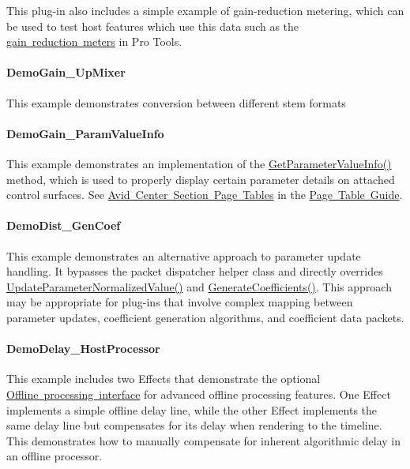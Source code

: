 This plug-\/in also includes a simple example of gain-\/reduction metering, which can be used to test host features which use this data such as the \mbox{\hyperlink{a00830_subsubsection__external_metering_and_internal_clip_}{gain reduction meters}} in Pro Tools.\hypertarget{a00848_DemoGain_UpMixer}{}\paragraph{Demo\+Gain\+\_\+\+Up\+Mixer}\label{a00848_DemoGain_UpMixer}
This example demonstrates conversion between different stem formats\hypertarget{a00848_DemoGain_ParamValueInfo}{}\paragraph{Demo\+Gain\+\_\+\+Param\+Value\+Info}\label{a00848_DemoGain_ParamValueInfo}
This example demonstrates an implementation of the \mbox{\hyperlink{a01669_a1702de6d62b5b41b6a8b2f510300392b}{Get\+Parameter\+Value\+Info()}} method, which is used to properly display certain parameter details on attached control surfaces. See \mbox{\hyperlink{a00833_aax_page_table_guide_04_avid_center_section_page_tables}{Avid Center Section Page Tables}} in the \mbox{\hyperlink{a00833}{Page Table Guide}}.\hypertarget{a00848_DemoDist_GenCoef}{}\paragraph{Demo\+Dist\+\_\+\+Gen\+Coef}\label{a00848_DemoDist_GenCoef}
This example demonstrates an alternative approach to parameter update handling. It bypasses the packet dispatcher helper class and directly overrides \mbox{\hyperlink{a01669_a685858711efb8634ce66c327f2865c71}{Update\+Parameter\+Normalized\+Value()}} and \mbox{\hyperlink{a01669_a083265b008921b6114ede387711694b7}{Generate\+Coefficients()}}. This approach may be appropriate for plug-\/ins that involve complex mapping between parameter updates, coefficient generation algorithms, and coefficient data packets.\hypertarget{a00848_DemoDelay_HostProcessor}{}\paragraph{Demo\+Delay\+\_\+\+Host\+Processor}\label{a00848_DemoDelay_HostProcessor}
This example includes two Effects that demonstrate the optional \mbox{\hyperlink{a00804}{Offline processing interface}} for advanced offline processing features. One Effect implements a simple offline delay line, while the other Effect implements the same delay line but compensates for its delay when rendering to the timeline. This demonstrates how to manually compensate for inherent algorithmic delay in an offline processor.

